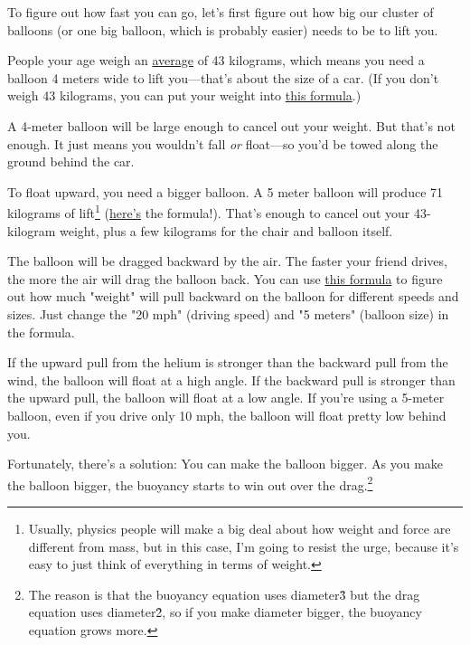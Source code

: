 {{To figure out how fast you can go, let's first figure out how big our cluster of balloons (or one big balloon, which is probably easier) needs to be to lift you.}

{People your age weigh an \href{http://www.cdc.gov/growthcharts/2000growthchart-us.pdf}{average} of 43 kilograms, which means you need a balloon 4 meters wide to lift you—that's about the size of a car. (If you don't weigh 43 kilograms, you can put your weight into \href{http://www.wolframalpha.com/input/?i=2*\%28\%283\%2F4\%29+*+\%2843+kg+\%2F+\%28air+density+-+helium+density\%29\%29+\%2F+pi\%29\%5E\%281\%2F3\%29} {this formula}.)}

{A 4-meter balloon will be large enough to cancel out your weight. But that's not enough. It just means you wouldn't fall \emph{or} float—so you'd be towed along the ground behind the car.}

{To float upward, you need a bigger balloon. A 5 meter balloon will produce 71 kilograms of lift{\footnote{Usually, physics people will make a big deal about how weight and force are different from mass, but in this case, I'm going to resist the urge, because it's easy to just think of everything in terms of weight.} } ​ (\href{http://www.wolframalpha.com/input/?i=1\%2F6+*+pi+*+\%285+meters\%29\%5E3+*+\%28air+density+-+helium+density\%29}{here's} the formula!). That's enough to cancel out your 43-kilogram weight, plus a few kilograms for the chair and balloon itself.}

{The balloon will be dragged backward by the air. The faster your friend drives, the more the air will drag the balloon back. You can use \href{http://www.wolframalpha.com/input/?i=\%281\%2F8+*+air+density+*+pi+*+\%285+meters\%29\%5E2+*+\%2820+mph\%29\%5E2+*+pi+*+0.47\%29+\%2F+earth+gravity}{this formula} to figure out how much "weight" will pull backward on the balloon for different speeds and sizes. Just change the "20 mph" (driving speed) and "5 meters" (balloon size) in the formula.}

{If the upward pull from the helium is stronger than the backward pull from the wind, the balloon will float at a high angle. If the backward pull is stronger than the upward pull, the balloon will float at a low angle. If you're using a 5-meter balloon, even if you drive only 10 mph, the balloon will float pretty low behind you.}

{Fortunately, there's a solution: You can make the balloon bigger. As you make the balloon bigger, the buoyancy starts to win out over the drag.{\footnote{The reason is that the buoyancy equation uses diameter\^3 but the drag equation uses diameter\^2, so if you make diameter bigger, the buoyancy equation grows more.} } }

}
